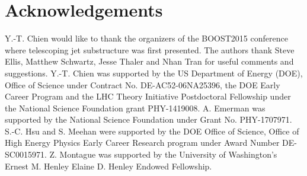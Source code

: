 \documentclass[aps,prl,floatfix,preprintnumbers,twocolumn,groupedaddress,nofootinbib]{revtex4-1}
\begin{document}
\section{Acknowledgements}
Y.-T. Chien would like to thank the organizers of the BOOST2015 conference where telescoping jet substructure was first presented. The authors thank Steve Ellis, Matthew Schwartz, Jesse Thaler and Nhan Tran for useful comments and suggestions. Y.-T. Chien was supported by the US Department of Energy (DOE), Office of Science under Contract No. DE-AC52-06NA25396, the DOE Early Career Program and the LHC Theory Initiative Postdoctoral Fellowship under the National Science Foundation grant PHY-1419008. A. Emerman was supported by the National Science Foundation under Grant No. PHY-1707971. S.-C. Hsu and S. Meehan were supported by the DOE Office of Science, Office of High Energy Physics Early Career Research program under Award Number DE-SC0015971. Z. Montague was supported by the University of Washington's Ernest M. Henley \text{\&} Elaine D. Henley Endowed Fellowship.



\end{document}
